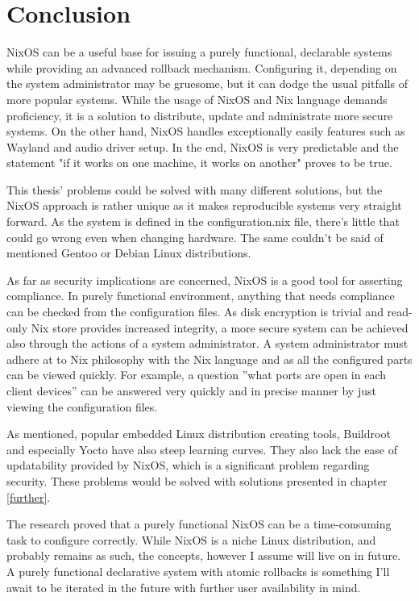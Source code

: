 \chapter{Conclusion} \label{conclusion}

NixOS can be a useful base for issuing a purely functional, declarable systems while providing an advanced rollback mechanism. Configuring it, depending on the system administrator may be gruesome, but it can dodge the usual pitfalls of more popular systems. While the usage of NixOS and Nix language demands proficiency, it is a solution to distribute, update and administrate more secure systems. On the other hand, NixOS handles exceptionally easily features such as Wayland and audio driver setup. In the end, NixOS is very predictable and the statement "if it works on one machine, it works on another" proves to be true.

This thesis' problems could be solved with many different solutions, but the NixOS approach is rather unique as it makes reproducible systems very straight forward. As the system is defined in the configuration.nix file, there's little that could go wrong even when changing hardware. The same couldn't be said of mentioned Gentoo or Debian Linux distributions.

As far as security implications are concerned, NixOS is a good tool for asserting compliance. In purely functional environment, anything that needs compliance can be checked from the configuration files. As disk encryption is trivial and read-only Nix store provides increased integrity, a more secure system can be achieved also through the actions of a system administrator. A system administrator must adhere at to Nix philosophy with the Nix language and as all the configured parts can be viewed quickly. For example, a question ''what ports are open in each client devices'' can be answered very quickly and in precise manner by just viewing the configuration files.

As mentioned, popular embedded Linux distribution creating tools, Buildroot and especially Yocto have also steep learning curves. They also lack the ease of updatability provided by NixOS, which is a significant problem regarding security. These problems would be solved with solutions presented in chapter \ref{further}.

The research proved that a purely functional NixOS can be a time-consuming task to configure correctly. While NixOS is a niche Linux distribution, and probably remains as such, the concepts, however I assume will live on in future. A purely functional declarative system with atomic rollbacks is something I'll await to be iterated in the future with further user availability in mind. 
